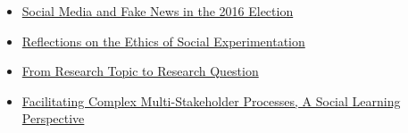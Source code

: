 \documentclass[openany]{book}
\begin{document}
\begin{itemize}
\item
  \href{https://pubs.aeaweb.org/doi/pdfplus/10.1257/jep.31.2.211}{Social Media and Fake News in the 2016 Election}
\item
  \href{https://www.degruyter.com/view/journals/jgd/6/1/article-p87.xml}{Reflections on the Ethics of Social Experimentation}
\item
  \href{https://us.sagepub.com/sites/default/files/upm-assets/72299_book_item_72299.pdf}{From Research Topic to Research Question}
\item
  \href{http://library.enaca.org/mangrove/publications/Woodhill_Facilitating_MSP.pdf}{Facilitating Complex Multi-Stakeholder Processes, A Social Learning Perspective}
\end{itemize}
\end{document}
